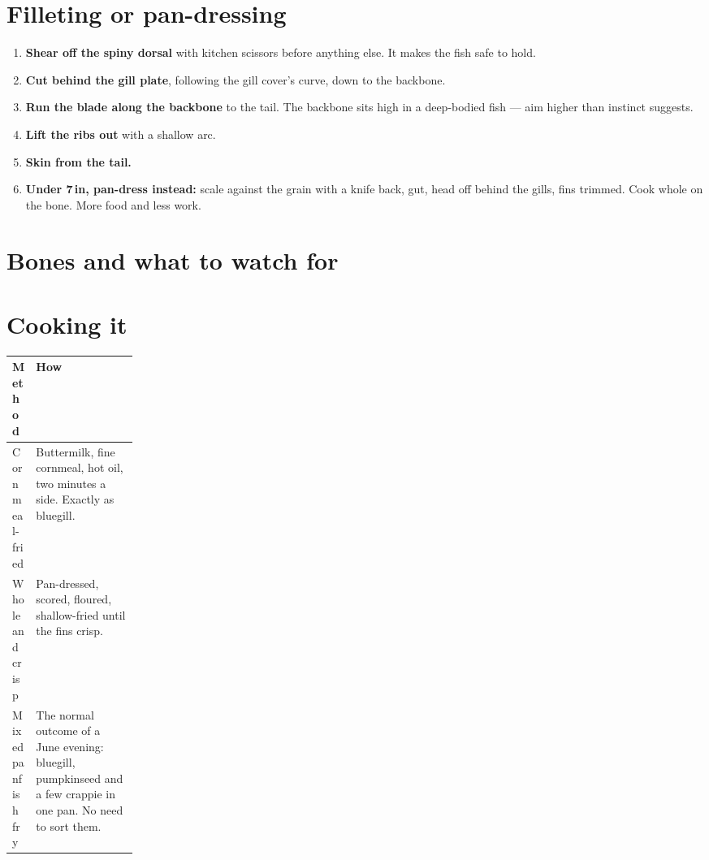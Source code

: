 \section{Filleting or pan-dressing}
\begin{enumerate}
\item \textbf{Shear off the spiny dorsal} with kitchen scissors before anything else. It makes the fish safe to hold.
\item \textbf{Cut behind the gill plate}, following the gill cover's curve, down to the backbone.
\item \textbf{Run the blade along the backbone} to the tail. The backbone sits high in a deep-bodied fish --- aim higher than instinct suggests.
\item \textbf{Lift the ribs out} with a shallow arc.
\item \textbf{Skin from the tail.}
\item \textbf{Under 7\,in, pan-dress instead:} scale against the grain with a knife back, gut, head off behind the gills, fins trimmed. Cook whole on the bone. More food and less work.
\end{enumerate}

\section{Bones and what to watch for}
\begin{telosfacts}[0.20]
\end{telosfacts}

\section{Cooking it}
\begin{tabularx}{\linewidth}{@{}p{0.18\linewidth}L@{}}
\toprule
\textbf{Method} & \textbf{How}\\
\midrule
Cornmeal-fried & Buttermilk, fine cornmeal, hot oil, two minutes a side. Exactly as bluegill. \\
Whole and crisp & Pan-dressed, scored, floured, shallow-fried until the fins crisp.\\
Mixed panfish fry & The normal outcome of a June evening: bluegill, pumpkinseed and a few crappie in one pan. No need to sort them.\\
\bottomrule
\end{tabularx}

